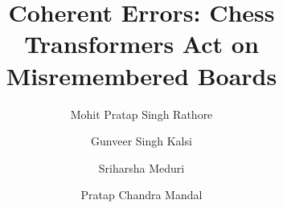 \documentclass[manuscript, screen, review]{jair}
\theoremstyle{remark}
\begin{document}
\title[Coherent Errors]{Coherent Errors: Chess Transformers Act on
Misremembered Boards}

\author{Mohit Pratap Singh Rathore}

\author{Gunveer Singh Kalsi}

\author{Sriharsha Meduri}

\author{Pratap Chandra Mandal}

\renewcommand{\shortauthors}{Rathore, Kalsi, Meduri \& Mandal}
\end{document}
